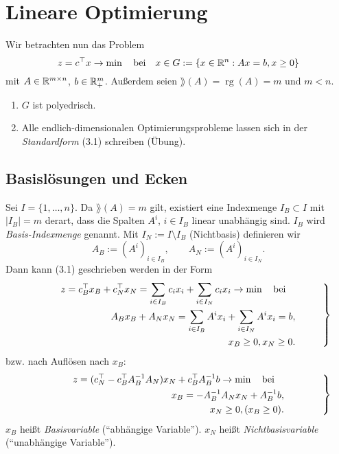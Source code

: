 \chapter{Lineare Optimierung}
Wir betrachten nun das Problem
\begin{equation}
  z = c^\top x \to \min \quad \text{bei} \quad x \in G := \{x \in \mathbb{R}^n : Ax = b, x \ge 0 \}
\end{equation}
mit $A \in \mathbb{R}^{m \times n}$, $b \in \mathbb{R}^m_+$. Außerdem seien $\rang(A) =
\operatorname{rg}(A) = m$ und $m < n$.

\begin{rmrk}
  \begin{enumerate}[(1)]
  \item $G$ ist polyedrisch.
  \item Alle endlich-dimensionalen Optimierungsprobleme lassen sich in der
    \emph{Standardform} (3.1) schreiben (Übung).
  \end{enumerate}
\end{rmrk}

\section{Basislösungen und Ecken}
Sei $I = \{1, \ldots, n \}$. Da $\rang(A) = m$ gilt, existiert eine Indexmenge
$I_B \subset I$ mit $|I_B| = m$ derart, dass die Spalten $A^i$, $i \in I_B$
linear unabhängig sind. $I_B$ wird \emph{Basis-Indexmenge} genannt. Mit $I_N :=
I \setminus I_B$ (Nichtbasis) definieren wir
\[ A_B := (A^i)_{i \in I_B}, \qquad A_N := (A^i)_{i \in I_N}. \]
Dann kann (3.1) geschrieben werden in der Form
\begin{equation}\groupequation{
  \begin{aligned}
    z = c_B^\top x_B + c_N^\top x_N = \sum_{i \in I_B} c_i x_i + \sum_{i \in I_N} c_i
    x_i \to \min \subjto \\
    A_B x_B + A_N x_N = \sum_{i \in I_B} A^i x_i + \sum_{i \in I_N} A^i x_i = b, \\
    x_B \ge 0, x_N \ge 0.
  \end{aligned}
}\end{equation}
bzw. nach Auflösen nach $x_B$:
\begin{equation}\groupequation{
  \begin{aligned}
    z = (c_N^\top - c_B^\top A_B^{-1} A_N) x_N + c_B^\top A_B^{-1} b \to \min
    \subjto \\
    x_B = -A_B^{-1} A_N x_N + A_B^{-1} b, \\
    x_N \ge 0, (x_B \ge 0).
  \end{aligned}
}\end{equation}
$x_B$ heißt \emph{Basisvariable} (``abhängige Variable''). $x_N$ heißt
\emph{Nichtbasisvariable} (``unabhängige Variable'').

